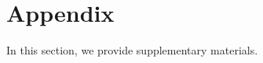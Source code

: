 \documentclass{article}
\theoremstyle{definition}
\begin{document}

\appendix

\section{Appendix}
\label{sec:osd:appendix}

In this section, we provide supplementary materials.

\renewcommand*{\bibfont}{\small} %
\printbibliography
\end{document}
